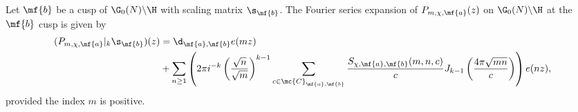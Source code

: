 \documentclass[12pt]{article}
\begin{document}
      \begin{proposition}\label{prop:Fourier_series_Poincare_modular}
        Let \(\mf{b}\) be a cusp of \(\G_{0}(N)\backslash\H\) with scaling matrix \(\s_{\mf{b}}\). The Fourier series expansion of \(P_{m,\chi,\mf{a}}(z)\) on \(\G_{0}(N)\backslash\H\) at the \(\mf{b}\) cusp is given by
        \begin{align*}
          (P_{m,\chi,\mf{a}}|_{k}\s_{\mf{b}})(z) &= \d_{\mf{a},\mf{b}}e(mz) \\
          &+ \sum_{n \ge 1}\left(2\pi i^{-k}\left(\frac{\sqrt{n}}{\sqrt{m}}\right)^{k-1}\sum_{\substack{c \in \mc{C}_{\mf{a},\mf{b}}}}\frac{S_{\chi,\mf{a},\mf{b}}(m,n,c)}{c}J_{k-1}\left(\frac{4\pi\sqrt{mn}}{c}\right)\right)e(nz),
        \end{align*}
        provided the index \(m\) is positive.
      \end{proposition}
\end{document}
